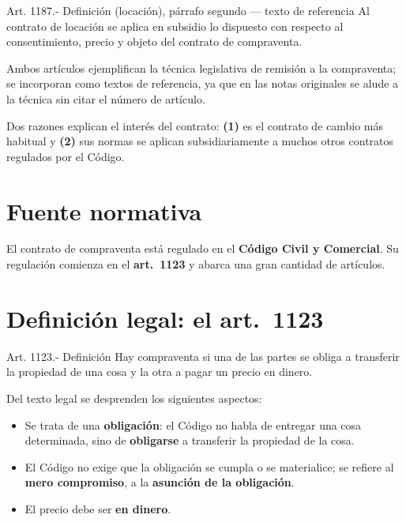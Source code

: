 \documentclass[12pt,oneside]{book}
\begin{document}
\begin{norma}{Art. 1187.- Definición (locación), párrafo segundo --- texto de referencia}
Al contrato de locación se aplica en subsidio lo dispuesto con respecto al consentimiento, precio y objeto del contrato de compraventa.
\end{norma}

Ambos artículos ejemplifican la técnica legislativa de remisión a la compraventa; se incorporan como textos de referencia, ya que en las notas originales se alude a la técnica sin citar el número de artículo.

\begin{important}
Dos razones explican el interés del contrato: \textbf{(1)} es el contrato de cambio más habitual y \textbf{(2)} sus normas se aplican subsidiariamente a muchos otros contratos regulados por el Código.
\end{important}

\section{Fuente normativa}

El contrato de compraventa está regulado en el \textbf{Código Civil y Comercial}. Su regulación comienza en el \textbf{art.~1123} y abarca una gran cantidad de artículos.

\section{Definición legal: el art.~1123}

\begin{norma}{Art. 1123.- Definición}
Hay compraventa si una de las partes se obliga a transferir la propiedad de una cosa y la otra a pagar un precio en dinero.
\end{norma}

Del texto legal se desprenden los siguientes aspectos:

\begin{itemize}
    \item Se trata de una \textbf{obligación}: el Código no habla de entregar una cosa determinada, sino de \textbf{obligarse} a transferir la propiedad de la cosa.
    \item El Código no exige que la obligación se cumpla o se materialice; se refiere al \textbf{mero compromiso}, a la \textbf{asunción de la obligación}.
    \item El precio debe ser \textbf{en dinero}.
\end{itemize}
\end{document}
